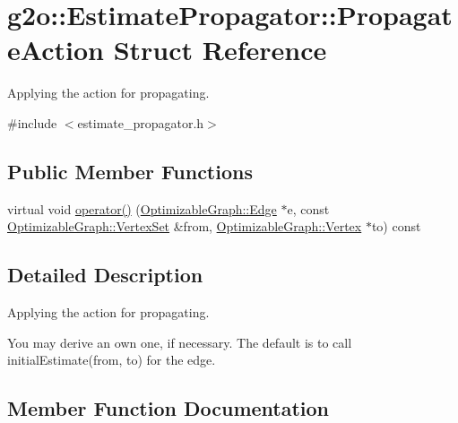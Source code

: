 \hypertarget{structg2o_1_1_estimate_propagator_1_1_propagate_action}{}\section{g2o\+:\+:Estimate\+Propagator\+:\+:Propagate\+Action Struct Reference}
\label{structg2o_1_1_estimate_propagator_1_1_propagate_action}


Applying the action for propagating.  




{\ttfamily \#include $<$estimate\+\_\+propagator.\+h$>$}

\subsection*{Public Member Functions}
\begin{DoxyCompactItemize}
\item 
virtual void \mbox{\hyperlink{structg2o_1_1_estimate_propagator_1_1_propagate_action_a4d101e9ee3f96e29d7cd0cd7bca1b656}{operator()}} (\mbox{\hyperlink{classg2o_1_1_optimizable_graph_1_1_edge}{Optimizable\+Graph\+::\+Edge}} $\ast$e, const \mbox{\hyperlink{classg2o_1_1_hyper_graph_a703938cdb4bb636860eed55a2489d70c}{Optimizable\+Graph\+::\+Vertex\+Set}} \&from, \mbox{\hyperlink{classg2o_1_1_optimizable_graph_1_1_vertex}{Optimizable\+Graph\+::\+Vertex}} $\ast$to) const
\end{DoxyCompactItemize}


\subsection{Detailed Description}
Applying the action for propagating. 

You may derive an own one, if necessary. The default is to call initial\+Estimate(from, to) for the edge. 

\subsection{Member Function Documentation}
\mbox{\label{structg2o_1_1_estimate_propagator_1_1_propagate_action_a4d101e9ee3f96e29d7cd0cd7bca1b656}} 
